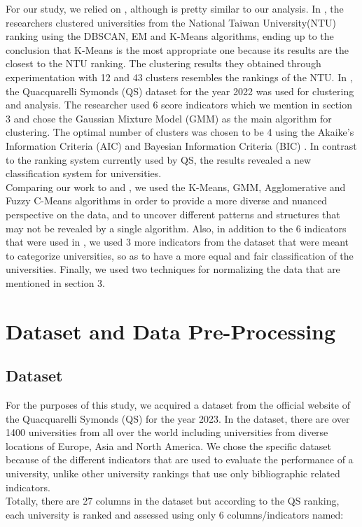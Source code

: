 \documentclass[conference]{IEEEtran}
\begin{document}
For our study, we relied on \cite{b7}, although \cite{b8} is pretty similar to our analysis. In \cite{b7}, the researchers clustered universities from the National Taiwan University(NTU) ranking using the DBSCAN, EM \cite{b15} and K-Means algorithms, ending up to the conclusion that K-Means is the most appropriate one because its results are the closest to the NTU ranking. The clustering results they obtained through experimentation with 12 and 43 clusters resembles the rankings of the NTU.  
In \cite{b8}, the Quacquarelli Symonds (QS) dataset for the year 2022 was used for clustering and analysis. The researcher used 6 score indicators which we mention in section 3 and chose the Gaussian Mixture Model (GMM) as the main algorithm for clustering. The optimal number of clusters was chosen to be 4 using the Akaike's Information Criteria (AIC) \cite{b12} and Bayesian Information Criteria (BIC) \cite{b13}. In contrast to the ranking system currently used by QS, the results revealed a new classification system for universities. \\
Comparing our work to \cite{b7} and \cite{b8}, we used the K-Means, GMM, Agglomerative and Fuzzy C-Means algorithms in order to provide a more diverse and nuanced perspective on the data, and to uncover different patterns and structures that may not be revealed by a single algorithm. Also, in addition to the 6 indicators that were used in \cite{b8}, we used 3 more indicators from the dataset that were meant to categorize universities, so as to have a more equal and fair classification of the universities. 
Finally, we used two techniques for normalizing the data that are mentioned in section 3.


\section{Dataset and Data Pre-Processing}
\subsection{Dataset}
For the purposes of this study, we acquired a dataset from the official website of the Quacquarelli Symonds (QS) for the year 2023. In the dataset, there are over 1400 universities from all over the world including universities from diverse locations of Europe, Asia and North America. We chose the specific dataset because of the different indicators that are used to evaluate the performance of a university, unlike other university rankings that use only bibliographic related indicators. \\
Totally, there are 27 columns in the dataset but according to the QS ranking, each university is ranked and assessed using only 6 columns/indicators named: \\
\end{document}
